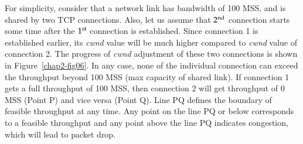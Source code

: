 \begin{multicols}{2}
For simplicity, consider that a network link has bandwidth of 100 MSS, and is shared by two TCP connections. Also, let us assume that ${\rm 2}^{\text{nd}}$ connection starts some time after the ${\rm 1}^{\text{st}}$  connection is established. Since connection 1 is established earlier, its \textit{cwnd} value will be much higher compared to \textit{cwnd} value of connection 2. The progress of \textit{cwnd} adjustment of these two connections is shown in Figure~\ref{chap2-fig06}. In any case, none of the individual connection can exceed the throughput  beyond 100 MSS (max capacity of shared link). If connection 1 gets a full throughput of 100 MSS, then connection 2 will get throughput of 0 MSS (Point P) and vice versa (Point Q).  Line PQ defines the boundary of feasible throughput at any time. Any point on the line PQ or below corresponds to a feasible throughput and any point above the line PQ indicates congestion, which will lead to packet drop.


\end{multicols}
